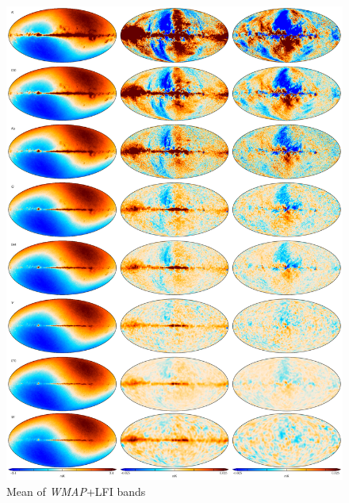 \documentclass[twocolumn]{../../common/aa}
\begin{document}
\begin{figure}
	\centering
	\includegraphics[width=0.93\linewidth]{figures/megaplot.pdf}
	\caption{Mean of \textit{WMAP}+LFI bands}
\end{figure}
\end{document}
